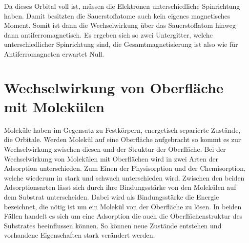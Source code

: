         Da dieses Orbital voll ist, müssen die Elektronen unterschiedliche Spinrichtung haben.
        Damit besitzten die Sauerstoffatome auch kein eigenes magnetisches Moment.
        Somit ist dann die Wechselwirkung über das Sauerstoffatom hinweg dann antiferromagnetisch.
        Es ergeben sich so zwei Untergitter, welche unterschiedlicher Spinrichtung sind, die Gesamtmagnetisierung ist also wie für Antiferromagneten erwartet Null.
            
    
    \section{Wechselwirkung von Oberfläche mit Molekülen}
        Moleküle haben im Gegensatz zu Festkörpern, energetisch separierte Zustände, die Orbitale.
        Werden Molekül auf eine Oberfläche aufgebracht so kommt es zur Wechselwirkung zwischen diesen und der Struktur der Oberfläche.
        Bei der Wechselwirkung von Molekülen mit Oberflächen wird in zwei Arten der Adsorption unterschieden. 
        Zum Einen der Physisorption und der Chemisorption, welche wiederum in stark und schwach unterschieden wird.
        Zwischen den beiden Adsorptionsarten lässt sich durch ihre Bindungsstärke von den Molekülen auf dem Substrat unterscheiden.
        Dabei wird als Bindungsstärke die Energie bezeichnet, die nötig ist um ein Molekül von der Oberfläche zu lösen.
        In beiden Fällen handelt es sich um eine Adsorption die auch die Oberflächenstruktur des Substrates beeinflussen können.
        So können neue Zustände entstehen und vorhandene Eigenschaften stark verändert werden.
        
